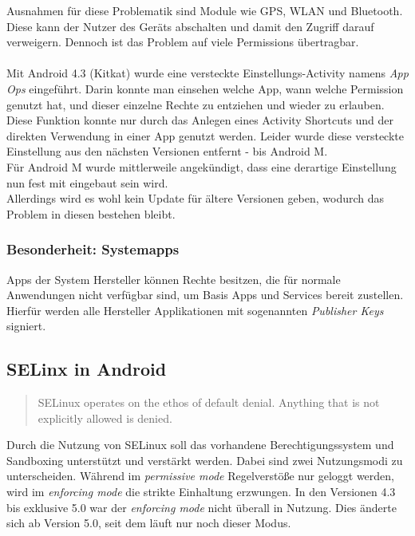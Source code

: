 	Ausnahmen für diese Problematik sind Module wie GPS, WLAN und Bluetooth. Diese kann der Nutzer des Geräts abschalten und damit den Zugriff darauf verweigern.
	Dennoch ist das Problem auf viele Permissions übertragbar.\\\\
	Mit Android 4.3 (Kitkat) wurde eine versteckte Einstellungs-Activity namens \textit{App Ops} eingeführt. Darin konnte man einsehen welche App, wann welche Permission genutzt hat, und dieser einzelne Rechte zu entziehen und wieder zu erlauben. Diese Funktion konnte nur durch das Anlegen eines Activity Shortcuts und der direkten Verwendung in einer App genutzt werden. Leider wurde diese versteckte Einstellung aus den nächsten Versionen entfernt - bis Android M. \cite{HiddenActivity} \\
	Für Android M wurde mittlerweile angekündigt, dass eine derartige Einstellung nun fest mit eingebaut sein wird.\cite{AndroidMPermission}\\
	Allerdings wird es wohl kein Update für ältere Versionen geben, wodurch das Problem in diesen bestehen bleibt.
	
	\subsubsection{Besonderheit: Systemapps}
	
	Apps der System Hersteller können Rechte besitzen, die für normale Anwendungen nicht verfügbar sind, um Basis Apps und Services bereit zustellen. Hierfür werden alle Hersteller Applikationen mit sogenannten \textit{Publisher Keys} signiert.
	
	\subsection{SELinx in Android}
	\begin{quote}
	SELinux operates on the ethos of default denial. Anything that is not explicitly allowed is denied.\cite{SELinuxAndroid}
	\end{quote}
	Durch die Nutzung von SELinux soll das vorhandene Berechtigungssystem und Sandboxing unterstützt und verstärkt werden. Dabei sind zwei Nutzungsmodi zu unterscheiden. Während im \textit{permissive mode} Regelverstöße nur geloggt werden, wird im \textit{enforcing mode} die strikte Einhaltung erzwungen. In den Versionen 4.3 bis exklusive 5.0 war der \textit{enforcing mode} nicht überall in Nutzung. Dies änderte sich ab Version 5.0, seit dem läuft nur noch dieser Modus.
	 
	
	

	